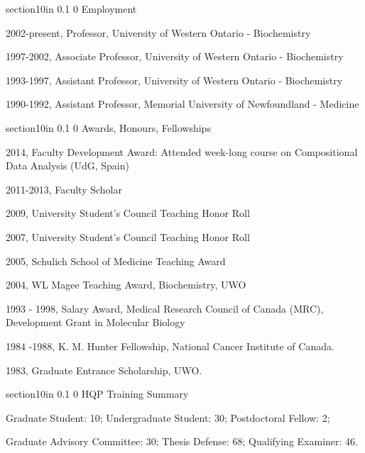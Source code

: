 \documentclass[11pt]{article}
\makeatletter
\renewcommand\section{\@startsection
	{section}{1}{0in}%
	{0.1\baselineskip}%
	{0\baselineskip}%
	{\sffamily\bfseries\large}
}
\makeatother
\begin{document}
\section{Employment}\itemsep=-2pt
\begin{description}\itemsep=-2pt
\item 2002-present, Professor, University of Western Ontario - Biochemistry
\item 1997-2002, Associate Professor, University of Western Ontario - Biochemistry
\item 1993-1997,	Assistant Professor, University of Western Ontario - Biochemistry
\item 1990-1992,	Assistant Professor, Memorial University of Newfoundland - Medicine
\end{description}

\section{Awards, Honours, Fellowships}
\begin{description}\itemsep=-2pt
\item 2014,       Faculty Development Award: Attended week-long course on Compositional Data Analysis (UdG, Spain)
\item 2011-2013,       Faculty Scholar
\item 2009,		University Student's Council Teaching Honor Roll
\item 2007,		University Student's Council Teaching Honor Roll
\item 2005,		Schulich School of Medicine Teaching Award
\item 2004,		WL Magee Teaching Award, Biochemistry, UWO
\item 1993 - 1998,	Salary Award, Medical Research Council of Canada (MRC), Development Grant in Molecular Biology
\item 1984 -1988, 	K. M. Hunter Fellowship, National Cancer Institute of Canada.
\item 1983,	       	Graduate Entrance Scholarship, UWO.
\end{description}

\section{HQP Training Summary}

\begin{description}\itemsep=-2pt
\item Graduate Student: 10;  Undergraduate Student: 30; Postdoctoral Fellow: 2; 
\item Graduate Advisory Committee: 30; Thesis Defense: 68; Qualifying Examiner: 46.
\end{description}
\end{document}
